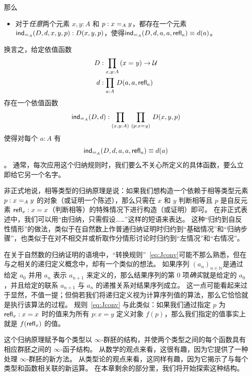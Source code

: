 那么

\begin{itemize}
\item 对于\emph{任意}两个元素 $x,y:A$ 和 $p:\id[A]xy$，都存在一个元素$\indid{A}(D,d,x,y,p):D(x,y,p)$，使得$\indid{A}(D,d,a,a,\refl a) \jdeq d(a)$。
\end{itemize}

换言之，给定依值函数
\begin{align*}
D & :\prd{x,y:A} (\id{x}{y}) \to \type\\
d & :\prd{a:A} D(a,a,\refl{a})
\end{align*}
存在一个依值函数
\[\indid{A}(D,d):\prd{x,y:A}{p:\id{x}{y}} D(x,y,p)\]
使得对每个 $a:A$ 有
\begin{equation}\label{eq:Jconv}
\indid{A}(D,d,a,a,\refl{a})\jdeq d(a)
\end{equation}。
通常，每次应用这个归纳规则时，我们要么不关心所定义的具体函数，要么立即给它另一个名字。

非正式地说，相等类型的归纳原理是说：如果我们想构造一个依赖于相等类型元素 $p:\id[A]xy$ 的对象（或证明一个陈述），那么只需在 $x$ 和 $y$ 判断相等且 $p$ 是自反元素 $\refl{x}:x=x$（判断相等）的特殊情况下进行构造（或证明）即可。
在非正式表述中，我们可以用``由归纳，只需假设……''这样的短语来表达。
这种``归约到自反性情形''的做法，类似于在自然数上作普通归纳证明时归约到``基础情况''和``归纳步骤''，也类似于在对不相交并或析取作分情形讨论时归约到``左情况''和``右情况''。%

在关于自然数的归纳证明的语境中，``转换规则''~\eqref{eq:Jconv}可能不那么熟悉，但在与之相关的递归定义概念中，却有一个类似的想法。
如果序列 $(a_n)_{n\in \mathbb{N}}$是通过给定 $a_0$ 并用 $a_n$ 表示 $a_{n+1}$ 来定义的，那么结果序列的第 $0$ 项\emph{确实}就是给定的 $a_0$，并且给定的联系 $a_{n+1}$ 与 $a_n$ 的递推关系对结果序列成立。
这一点可能看起来过于显然，不值一提；但倘若我们将递归定义视为计算序列值的算法，那么它恰恰就是执行该算法的过程。
规则~\eqref{eq:Jconv} 与此类似：如果我们通过指定 $p$ 为 $\refl{x}:x=x$ 时的值来为所有 $p:x=y$ 定义对象 $f(p)$，那么我们指定的值事实上就是 $f(\refl{x})$ 的值。

这个归纳原理赋予每个类型以 $\infty$-群胚的结构，并使两个类型之间的每个函数具有相应群胚之间的 $\infty$-函子结构。
从数学的观点来看，这很有趣，因为它提供了一种处理 $\infty$-群胚的新方法。
从类型论的观点来看，这同样有趣，因为它揭示了与每个类型和函数相关联的新运算。
在本章剩余的部分里，我们将开始探索这种结构。

